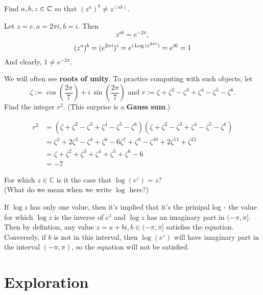 \documentclass{homework}
\begin{document}
\begin{problem}
  Find $a, b, z \in \mathbb{C}$ so that $\left(z^a\right)^b \neq z^{\left(ab\right)}$.
\end{problem}
\begin{solution}
Let $z=e, a=2\pi i, b=i$. Then 
\[
z^{ab} = e^{-2\pi},
\]
\[(z^{a})^b = (e^{2\pi i})^i = e^{i\operatorname{Log}{(e^{2\pi i})}} = e^{i{0}} = 1\]
And clearly, $1\neq e^{-2\pi}$.
\end{solution}
\begin{problem}
  We will often see \textbf{roots of unity}.  To practice computing with such objects, let
  \[
    \zeta := \cos \left( \frac{2\pi}{7} \right) + i \, \sin \left( \frac{2\pi}{7} \right) \mbox{ and }
    r := \zeta + \zeta^2 - \zeta^3 + \zeta^4 - \zeta^5 - \zeta^6.
  \]
  Find the integer $r^2$.  (This surprise is a \textbf{Gauss sum}.)
\end{problem}
\begin{solution}
\begin{align*}
r^2 &= (\zeta + \zeta^2 - \zeta^3 + \zeta^4 - \zeta^5 - \zeta^6)(\zeta + \zeta^2 - \zeta^3 + \zeta^4 - \zeta^5 - \zeta^6)\\
&= \zeta^2 + 2\zeta^3 - \zeta^4 + \zeta^6 - 6\zeta^7 + \zeta^8 - \zeta^{10} + 2\zeta^{11} + \zeta^{12}\\
&= \zeta + \zeta^2 + \zeta^3 + \zeta^4 + \zeta^5 + \zeta^6 - 6\\
&= -7
\end{align*}
\end{solution}
\begin{problem}
For which $z \in \mathbb{C}$ is it the case that $\log \left( e^z \right) = z$?  \\ (What do we mean when we write $\log$ here?)
\end{problem}
\begin{solution}
If $\log z$ has only one value, then it's implied that it's the prinipal log - the value for which $\log z$ is the inverse of $e^z$ and $\log z$ has an imaginary part in $(-\pi, \pi]$. Then by defintion, any value $z = a+bi, b\in (-\pi, \pi]$ satisfies the equation. Conversely, if $b$ is not in this interval, then $\log(e^z)$ will have imaginary part in the interval $(-\pi, \pi)$, so the equation will not be satisfied.
\end{solution}
\section{Exploration}
\end{document}
